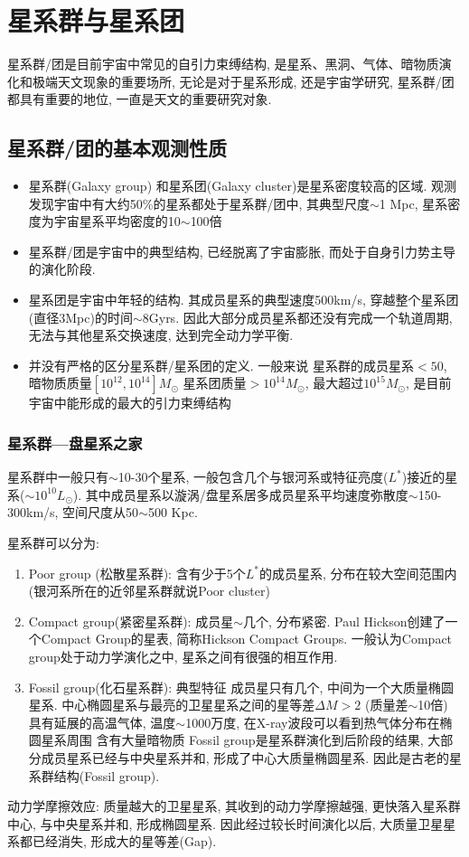 \newpage
\section{星系群与星系团}
\small
星系群/团是目前宇宙中常见的自引力束缚结构, 是星系、黑洞、气体、暗物质演化和极端天文现象的重要场所, 无论是对于星系形成, 还是宇宙学研究, 星系群/团都具有重要的地位, 一直是天文的重要研究对象. 
\normalsize
\subsection{星系群/团的基本观测性质}
\begin{itemize}\small
    \item 星系群(Galaxy group) 和星系团(Galaxy cluster)是星系密度较高的区域. 观测发现宇宙中有大约50\%的星系都处于星系群/团中, 其典型尺度$\sim$1 Mpc, 星系密度为宇宙星系平均密度的10$\sim$100倍
    \item  星系群/团是宇宙中的典型结构, 已经脱离了宇宙膨胀, 而处于自身引力势主导的演化阶段. 
    \item 星系团是宇宙中年轻的结构. 其成员星系的典型速度500km/s, 穿越整个星系团(直径3Mpc)的时间$\sim$8Gyrs. 因此大部分成员星系都还没有完成一个轨道周期, 无法与其他星系交换速度, 达到完全动力学平衡. 
    \item 并没有严格的区分星系群/星系团的定义. 一般来说
    \subitem 星系群的成员星系$<50$, 暗物质质量$[10^{12}, 10^{14}]M_{\odot}$
    \subitem 星系团质量$>10^{14} M_{\odot}$, 最大超过$10^{15} M_{\odot}$, 是目前宇宙中能形成的最大的引力束缚结构
\end{itemize}

\subsubsection{星系群---盘星系之家}
星系群中一般只有$\sim$10-30个星系, 一般包含几个与银河系或特征亮度($L^*$)接近的星系($\sim10^{10} L_{\odot}$). 其中成员星系以漩涡/盘星系居多成员星系平均速度弥散度$\sim$150-300km/s, 空间尺度从50$\sim$500 Kpc. 

星系群可以分为:
\begin{enumerate}\small
    \item Poor group (松散星系群): 含有少于5个$L^*$的成员星系, 分布在较大空间范围内 (银河系所在的近邻星系群就说Poor cluster)
    \item Compact group(紧密星系群): 成员星$\sim$几个, 分布紧密. Paul Hickson创建了一个Compact Group的星表, 简称Hickson Compact Groups. 一般认为Compact group处于动力学演化之中, 星系之间有很强的相互作用. 
    \item Fossil group(化石星系群): 典型特征
    \subitem 成员星只有几个, 中间为一个大质量椭圆星系. 中心椭圆星系与最亮的卫星星系之间的星等差$\Delta M > 2$ (质量差$\sim$10倍)
    \subitem 具有延展的高温气体, 温度$\sim$1000万度, 在X-ray波段可以看到热气体分布在椭圆星系周围
    \subitem 含有大量暗物质
    \subitem Fossil group是星系群演化到后阶段的结果, 大部分成员星系已经与中央星系并和, 形成了中心大质量椭圆星系. 因此是古老的星系群结构(Fossil group). 
\end{enumerate}
动力学摩擦效应: 质量越大的卫星星系, 其收到的动力学摩擦越强, 更快落入星系群中心, 与中央星系并和, 形成椭圆星系. 因此经过较长时间演化以后, 大质量卫星星系都已经消失, 形成大的星等差(Gap). 

